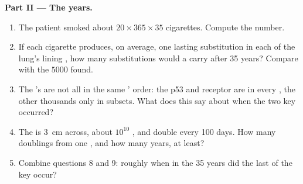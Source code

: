 \begin{problem}
\medskip
\noindent\textbf{Part II --- The years.}
\begin{enumerate}[resume]
  \item The patient smoked about $20 \times 365 \times 35$
        cigarettes. Compute the number.
  \item If each cigarette produces, on average, one lasting
        substitution in each of the lung's lining , how many
        substitutions would a  carry after 35 years? Compare with
        the $\num{5000}$ found.
  \item The 's  are not all in the same ' order:
        the p53 and receptor  are in every  , the
        other thousands only in subsets. What does this say about
        when the two key  occurred?
  \item The  is \qty{3}{cm} across, about $10^{10}$ , and
          double every 100 days. How many doublings from
        one , and how many years, at least?
  \item Combine questions 8 and 9: roughly when in the 35 years did
        the last of the key  occur?
\end{enumerate}


\end{problem}
